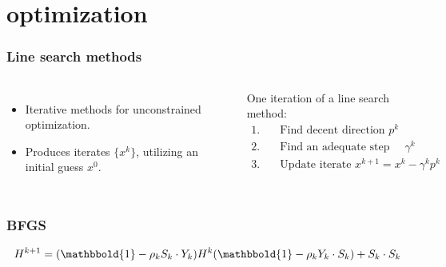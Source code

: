\documentclass[9pt]{beamer}
\begin{document}
\section{optimization}
\begin{frame}
\frametitle{Line search methods}
\begin{columns}
\begin{itemize}
\item{Iterative methods for unconstrained optimization.}
\item{Produces iterates $\{x^k\}$, utilizing an initial guess $x^0$.}
\end{itemize}
One iteration of a line search method:
{\small
\begin{align*}
1.\quad& \textrm{Find decent direction $p^k$}\\
2.\quad& \textrm{Find an adequate step length $\gamma^k$}\\
3.\quad& \textrm{Update iterate $x^{k+1} = x^k -\gamma^k p^k$}
\end{align*}
}%
\end{columns}
\end{frame}
\begin{frame}
\frametitle{BFGS}
\begin{align*}
H^{k+1} = (\mathbbold{1}-\rho_kS_k\cdot Y_k)H^k(\mathbbold{1} -\rho_kY_k\cdot S_k) + S_k\cdot S_k
\end{align*}
\end{frame}
\end{document}
